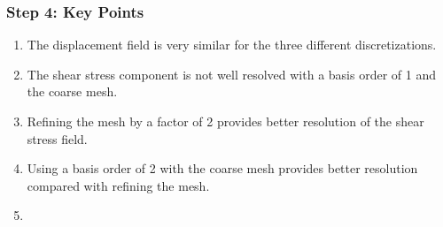 \documentclass[aspectratio=169]{beamer}
\begin{document}
\begin{frame}
  \frametitle{Step 4: Key Points}
  \summary{}

  \begin{enumerate}
  \item The displacement field is very similar for the three different discretizations.\pause
  \item The shear stress component is not well resolved with a basis order of 1 and the coarse mesh.\pause
  \item Refining the mesh by a factor of 2 provides better resolution of the shear stress field.\pause
  \item Using a basis order of 2 with the coarse mesh provides better resolution compared with refining the mesh.\pause
  \item {}
  \end{enumerate}

\end{frame}

\end{document}
